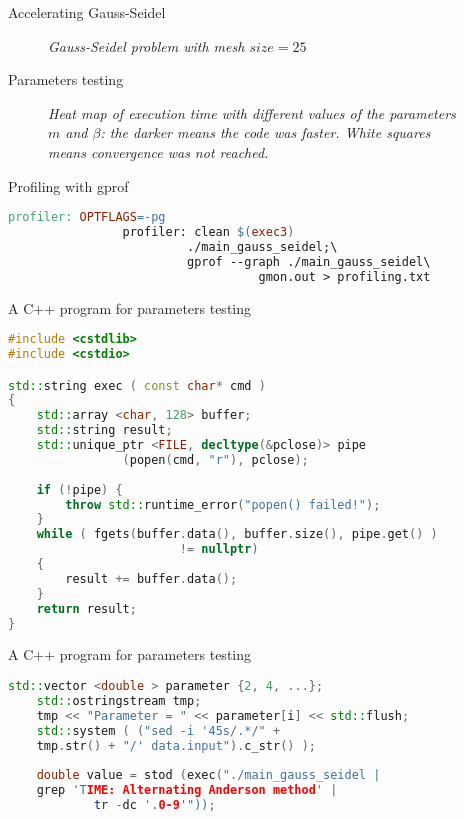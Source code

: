 \documentclass{beamer}
\begin{document}
				\begin{frame}{Accelerating Gauss-Seidel}
			\begin{figure}
			{\scriptsize
			}
			\centering
			\caption{\textit{Gauss-Seidel problem with mesh $size=25$}}
			\end{figure}
			\end{frame}
			
			
			\begin{frame}[fragile]{Parameters testing}
			\begin{figure}
			{\scriptsize
			\resizebox{\textwidth}{!}{}
			\centering
			\caption{\textit{Heat map of execution time with different values of the parameters $m$ and $\beta$: the darker means the code was faster. White squares means
			convergence was not reached.}}}
			\end{figure}
			\end{frame}
			
			\begin{frame}[fragile]{Profiling with gprof}
				\begin{lstlisting}[language=make]
				profiler: OPTFLAGS=-pg
				profiler: clean $(exec3)
				         ./main_gauss_seidel;\
				         gprof --graph ./main_gauss_seidel\
					               gmon.out > profiling.txt
				\end{lstlisting}
			\end{frame}	
			
			\begin{frame}[fragile]{A C++ program for parameters testing}
				\begin{lstlisting}[basicstyle=\scriptsize, language=C++]
#include <cstdlib>
#include <cstdio>

std::string exec ( const char* cmd ) 
{
	std::array <char, 128> buffer;
	std::string result;
	std::unique_ptr <FILE, decltype(&pclose)> pipe
				(popen(cmd, "r"), pclose);
			
	if (!pipe) {
		throw std::runtime_error("popen() failed!");
	}
	while ( fgets(buffer.data(), buffer.size(), pipe.get() )
						!= nullptr) 
	{
		result += buffer.data();
	}
	return result;
}
				\end{lstlisting}
			\end{frame}
			
			\begin{frame}[fragile]{A C++ program for parameters testing}
						\begin{lstlisting}[basicstyle=\scriptsize, language=C++]
	std::vector <double > parameter {2, 4, ...};
	std::ostringstream tmp;
	tmp << "Parameter = " << parameter[i] << std::flush;
	std::system ( ("sed -i '45s/.*/" + 
	tmp.str() + "/' data.input").c_str() );
	
	double value = stod (exec("./main_gauss_seidel |
	grep 'TIME: Alternating Anderson method' |
			tr -dc '.0-9'"));
			\end{lstlisting}
			\end{frame}
			
\end{document}

